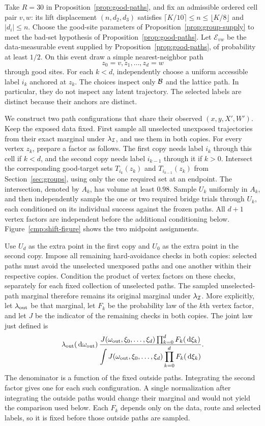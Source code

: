 Take $R=30$ in Proposition~\ref{prop:good-paths}, and fix an admissible
ordered cell pair $v,w$: its lift displacement $(n,d_2,d_3)$ satisfies
$\lceil K/10\rceil\le n\le\lfloor K/8\rfloor$ and $|d_i|\le n$.
Choose the good-site
parameters of Proposition~\ref{prop:group-supply} to meet the bad-set hypothesis
of Proposition~\ref{prop:good-paths}. Let $\mathcal E_{vw}$ be the data-measurable
event supplied by Proposition~\ref{prop:good-paths}, of probability at least $1/2$. On this event draw a simple nearest-neighbor
path
\[
 z_0=v,z_1,\ldots,z_d=w
\]
through good sites. For each $k<d$, independently choose a uniform accessible
label $i_k$ anchored at $z_k$. The choices inspect only $\mathcal B$ and the lattice
path. In particular, they do not inspect any latent trajectory. The selected
labels are distinct because their anchors are distinct.

We construct two path configurations that share their observed $(x,y,X',W')$.
Keep the exposed data fixed. First sample all unselected unexposed
trajectories from their exact marginal under $\lambda_{\mathcal I}$, and use
them in both copies. For every vertex $z_k$, prepare a factor as follows.
The first copy needs label $i_k$ through this cell if $k<d$, and the second
copy needs label $i_{k-1}$ through it if $k>0$. Intersect the corresponding
good-target sets $T_{i_k}(z_k)$ and $T_{i_{k-1}}(z_k)$ from
Section~\ref{sec:groups}, using only the one required set at an endpoint.
The intersection, denoted by $A_k$, has volume at least $0.98$.
Sample $U_k$ uniformly in $A_k$, and then independently sample the one or
two required bridge trials through $U_k$, each conditioned on its individual
success against the frozen paths. All $d+1$ vertex factors are independent
before the additional conditioning below. Figure~\ref{cmp:shift-figure}
shows the two midpoint assignments.

Use $U_d$ as the extra point in the first copy and $U_0$ as the extra point
in the second copy. Impose all remaining hard-avoidance checks in both
copies: selected paths must avoid the unselected unexposed paths and one another
within their respective copies. Condition the product of vertex factors on
these checks, separately for each fixed collection of unselected paths.
The sampled unselected-path marginal therefore remains its original marginal
under $\lambda_{\mathcal I}$.
More explicitly, let $\lambda_{\rm out}$ be that marginal, let $F_k$ be
the probability law of the $k$th vertex factor, and let $J$ be the
indicator of the remaining checks in both copies. The joint law just
defined is
\begin{equation}\label{cmp:fixed-outside-law}
 \lambda_{\rm out}(\,\mathrm d\omega_{\rm out})\,
 \frac{J(\omega_{\rm out},\xi_0,\ldots,\xi_d)
             \prod_{k=0}^d F_k(\,\mathrm d\xi_k)}
      {\displaystyle\int J(\omega_{\rm out},\xi_0,\ldots,\xi_d)
             \prod_{k=0}^d F_k(\,\mathrm d\xi_k)}.
\end{equation}
The denominator is a function of the fixed outside paths. Integrating the
second factor gives one for each such configuration. A single normalization
after integrating the outside paths would change their marginal and would
not yield the comparison used below. Each $F_k$ depends only on the data,
route and selected labels, so it is fixed before those outside paths are
sampled.

